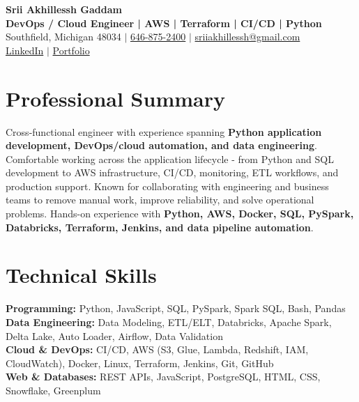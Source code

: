 \documentclass[letterpaper,10pt]{article}
\begin{document}
\fontsize{9.35pt}{10.45pt}\selectfont

\begin{center}
    {\LARGE \textbf{Srii Akhillessh Gaddam}} \\[-1pt]
    \textbf{DevOps / Cloud Engineer | AWS | Terraform | CI/CD | Python} \\[2pt]
    Southfield, Michigan 48034 $|$
    \href{tel:6468752400}{646-875-2400} $|$
    \href{mailto:sriiakhillessh@gmail.com}{sriiakhillessh@gmail.com} \\[1pt]
    \href{https://www.linkedin.com/in/srii-akhiilessh-gaddam-b48668191/}{LinkedIn} $|$
    \href{https://sriiakhillesshg.github.io/portfolio/}{Portfolio}
\end{center}
\vspace{-8pt}

\section{Professional Summary}
\small{Cross-functional engineer with experience spanning \textbf{Python application development, DevOps/cloud automation, and data engineering}. Comfortable working across the application lifecycle - from Python and SQL development to AWS infrastructure, CI/CD, monitoring, ETL workflows, and production support. Known for collaborating with engineering and business teams to remove manual work, improve reliability, and solve operational problems. Hands-on experience with \textbf{Python, AWS, Docker, SQL, PySpark, Databricks, Terraform, Jenkins, and data pipeline automation}.}

\section{Technical Skills}
\small{
\textbf{Programming:} Python, JavaScript, SQL, PySpark, Spark SQL, Bash, Pandas \\
\textbf{Data Engineering:} Data Modeling, ETL/ELT, Databricks, Apache Spark, Delta Lake, Auto Loader, Airflow, Data Validation \\
\textbf{Cloud \& DevOps:} CI/CD, AWS (S3, Glue, Lambda, Redshift, IAM, CloudWatch), Docker, Linux, Terraform, Jenkins, Git, GitHub \\
\textbf{Web \& Databases:} REST APIs, JavaScript, PostgreSQL, HTML, CSS, Snowflake, Greenplum
}
\end{document}
